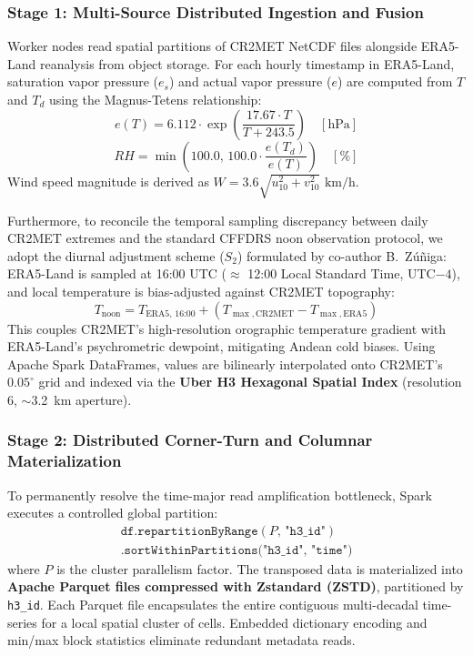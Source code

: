 \documentclass[10pt,conference]{IEEEtran}
\begin{document}
\subsubsection{Stage 1: Multi-Source Distributed Ingestion and Fusion}
Worker nodes read spatial partitions of CR2MET NetCDF files alongside ERA5-Land reanalysis from object storage. For each hourly timestamp in ERA5-Land, saturation vapor pressure ($e_s$) and actual vapor pressure ($e$) are computed from $T$ and $T_d$ using the Magnus-Tetens relationship:
\begin{equation}
e(T) = 6.112 \cdot \exp\left(\frac{17.67 \cdot T}{T + 243.5}\right) \quad [\text{hPa}]
\end{equation}
\begin{equation}
RH = \min\left(100.0,\, 100.0 \cdot \frac{e(T_d)}{e(T)}\right) \quad [\%]
\end{equation}
Wind speed magnitude is derived as $W = 3.6 \sqrt{u_{10}^2 + v_{10}^2}\text{ km/h}$. 

Furthermore, to reconcile the temporal sampling discrepancy between daily CR2MET extremes and the standard CFFDRS noon observation protocol, we adopt the diurnal adjustment scheme ($S_2$) formulated by co-author B.~Z\'u\~niga: ERA5-Land is sampled at 16:00 UTC ($\approx$ 12:00 Local Standard Time, UTC$-4$), and local temperature is bias-adjusted against CR2MET topography:
\begin{equation}
T_{\text{noon}} = T_{\text{ERA5, 16:00}} + \left( T_{\max, \text{CR2MET}} - T_{\max, \text{ERA5}} \right)
\end{equation}
This couples CR2MET's high-resolution orographic temperature gradient with ERA5-Land's psychrometric dewpoint, mitigating Andean cold biases. Using Apache Spark DataFrames, values are bilinearly interpolated onto CR2MET's $0.05^\circ$ grid and indexed via the \textbf{Uber H3 Hexagonal Spatial Index} (resolution 6, $\sim$3.2~km aperture).

\subsubsection{Stage 2: Distributed Corner-Turn and Columnar Materialization}
To permanently resolve the time-major read amplification bottleneck, Spark executes a controlled global partition:
\begin{equation*}
\begin{split}
\texttt{df.repartitionByRange}(P,\, \texttt{"h3\_id"}) \\
\texttt{.sortWithinPartitions("h3\_id", "time")}
\end{split}
\end{equation*}
where $P$ is the cluster parallelism factor. The transposed data is materialized into \textbf{Apache Parquet files compressed with Zstandard (ZSTD)}, partitioned by \texttt{h3\_id}. Each Parquet file encapsulates the entire contiguous multi-decadal time-series for a local spatial cluster of cells. Embedded dictionary encoding and min/max block statistics eliminate redundant metadata reads.
\end{document}
